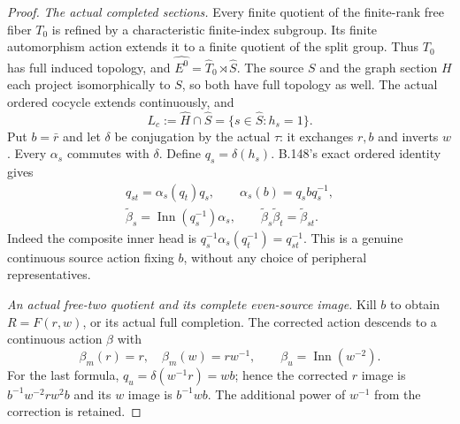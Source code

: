 \begin{proof}
\emph{The actual completed sections.}
Every finite quotient of the finite-rank free fiber $T_0$ is refined by
a characteristic finite-index subgroup. Its finite automorphism action
extends it to a finite quotient of the split group. Thus $T_0$ has full
induced topology, and
$\widehat{E^0}=\widehat T_0\rtimes\widehat S$.
The source $S$ and the graph section $H$ each project isomorphically to
$S$, so both have full topology as well. The actual ordered cocycle
extends continuously, and
\[
 L_c:=\widehat H\cap\widehat S
     =\{s\in\widehat S:h_s=1\}.
\]
Put $b=\bar r$ and let $\delta$ be conjugation by the actual $\tau$:
it exchanges $r,b$ and inverts $w$. Every $\alpha_s$ commutes with
$\delta$. Define $q_s=\delta(h_s)$. B.148's exact ordered identity gives
\begin{equation}\label{eq:B153-correction}
\begin{gathered}
 q_{st}=\alpha_s(q_t)q_s,\qquad
 \alpha_s(b)=q_sbq_s^{-1},\\
 \widetilde\beta_s=\operatorname{Inn}(q_s^{-1})\alpha_s,
 \qquad\widetilde\beta_s\widetilde\beta_t
       =\widetilde\beta_{st}.
\end{gathered}
\end{equation}
Indeed the composite inner head is
$q_s^{-1}\alpha_s(q_t^{-1})=q_{st}^{-1}$.
This is a genuine continuous source action fixing $b$, without any
choice of peripheral representatives.

\emph{An actual free-two quotient and its complete even-source image.}
Kill $b$ to obtain $R=F(r,w)$, or its actual full completion.
The corrected action descends to a continuous action $\beta$ with
\begin{equation}\label{eq:B153-beta}
 \beta_m(r)=r,\quad\beta_m(w)=rw^{-1},\qquad
 \beta_u=\operatorname{Inn}(w^{-2}).
\end{equation}
For the last formula, $q_u=\delta(w^{-1}r)=wb$; hence the corrected
$r$ image is $b^{-1}w^{-2}rw^2b$ and its $w$ image is $b^{-1}wb$.
The additional power of $w^{-1}$ from the correction is retained.


\end{proof}
